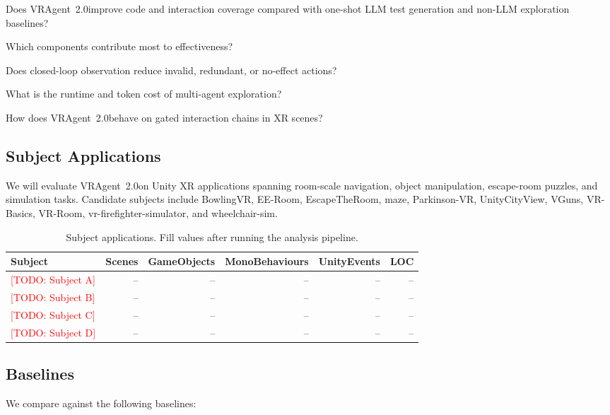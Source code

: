 \documentclass[10pt,conference]{IEEEtran}
\newcommand{\todo}[1]{\textcolor{red}{[TODO: #1]}}
\newcommand{\tool}{VRAgent~2.0}
\begin{document}
\begin{description}[leftmargin=*]
  \item[RQ1] Does \tool improve code and interaction coverage compared with
  one-shot LLM test generation and non-LLM exploration baselines?
  \item[RQ2] Which components contribute most to effectiveness?
  \item[RQ3] Does closed-loop observation reduce invalid, redundant, or
  no-effect actions?
  \item[RQ4] What is the runtime and token cost of multi-agent exploration?
  \item[RQ5] How does \tool behave on gated interaction chains in XR scenes?
\end{description}

\subsection{Subject Applications}

We will evaluate \tool on Unity XR applications spanning room-scale navigation,
object manipulation, escape-room puzzles, and simulation tasks. Candidate
subjects include BowlingVR, EE-Room, EscapeTheRoom, maze, Parkinson-VR,
UnityCityView, VGuns, VR-Basics, VR-Room, vr-firefighter-simulator, and
wheelchair-sim.

\begin{table}[t]
\centering
\caption{Subject applications. Fill values after running the analysis pipeline.}
\label{tab:subjects}
\begin{tabular}{lrrrrr}
\toprule
Subject & Scenes & GameObjects & MonoBehaviours & UnityEvents & LOC \\
\midrule
\todo{Subject A} & -- & -- & -- & -- & -- \\
\todo{Subject B} & -- & -- & -- & -- & -- \\
\todo{Subject C} & -- & -- & -- & -- & -- \\
\todo{Subject D} & -- & -- & -- & -- & -- \\
\bottomrule
\end{tabular}
\end{table}

\subsection{Baselines}

We compare against the following baselines:
\end{document}
